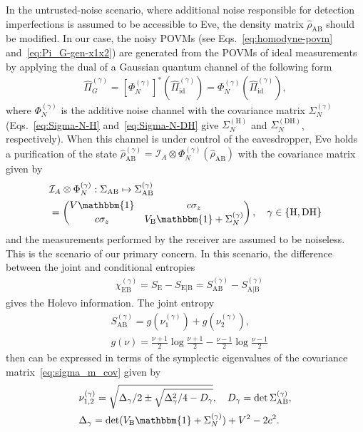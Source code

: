 \documentclass[%
reprint,
superscriptaddress,
 amsmath,amssymb,amsfonts,
 aps,
 pra,
 longbibliography
]{revtex4-2}
\newcommand{\cnj}[1]{{#1}^{\ast}}
\newcommand{\ind}[1]{\mathrm{#1}}
\begin{document}
In the untrusted-noise scenario,
where additional noise
responsible for detection imperfections
is assumed to be accessible to Eve,
the density matrix $\hat{\rho}_{\ind{AB}}$ should be modified.
In our case, the noisy POVMs
(see Eqs.~\eqref{eq:homodyne-povm}
and~\eqref{eq:Pi_G-gen-x1x2})
are generated from the POVMs of ideal measurements
by applying the dual of a Gaussian quantum channel
of the following form
\begin{align}
  \label{eq:Phi_N_Pi}
  \hat{\Pi}_G^{(\gamma)}=
  \cnj{[\Phi_N^{(\gamma)}]}(\hat{\Pi}_{\ind{id}}^{(\gamma)})=
  \Phi_N^{(\gamma)}(\hat{\Pi}_{\ind{id}}^{(\gamma)}),
\end{align}
where $\Phi_N^{(\gamma)}$
is the additive noise channel
with the covariance matrix
$\Sigma_N^{(\gamma)}$
(Eqs.~\eqref{eq:Sigma-N-H} and~\eqref{eq:Sigma-N-DH}
give
$\Sigma_N^{(\ind{H})}$ and $\Sigma_N^{(\ind{DH})}$,
respectively).
When this channel is under control of the eavesdropper, 
Eve holds a purification of the state
$\hat{\rho}_{\ind{AB}}^{(\gamma)}=\mathcal{I}_A\otimes\Phi_N^{(\gamma)}(\hat{\rho}_{\ind{AB}})$
with the covariance matrix given by
\begin{align}
  &
  \label{eq:sigma_m_cov}
\mathcal{I}_A\otimes \Phi_{N}^{(\gamma)}:
  \Sigma_{\ind{AB}}\mapsto
  \Sigma_{\ind{AB}}^{(\gamma)}
  \notag
  \\
  &
  =\begin{pmatrix}
    V\mathbbm{1}&c\sigma_z\\
    c\sigma_z&V_{\ind{B}}\mathbbm{1}+\Sigma_N^{(\gamma)}
\end{pmatrix},\quad \gamma\in\{\ind{H},\ind{DH}\}
\end{align}
and the measurements performed by the receiver
are assumed to be noiseless.
This is the scenario of our primary concern.
In this scenario, 
the difference between the joint and conditional entropies
\begin{align}
  \label{eq:chi}
  &
  \chi_{\ind{EB}} ^{(\gamma)}
    =
    S_{\ind{E}}-S_{\ind{E}|\ind{B}}=S_{\ind{AB}}^{(\gamma)}-S_{\ind{A}|\ind{B}}^{(\gamma)}
\end{align}
gives the Holevo information.
The joint entropy
\begin{align}
  &
  \label{eq:S_AB-gamma}
  S_{\ind{AB}}^{(\gamma)}=g(\nu_1^{(\gamma)})+g(\nu_2^{(\gamma)}),
  \\
  &
\label{eq:g(nu)}
    g(\nu)=\frac{\nu+1}{2}\log \frac{\nu+1}{2}-
    \frac{\nu-1}{2}\log\frac{\nu-1}{2}    
\end{align}
then can be expressed in terms of
the symplectic eigenvalues of the covariance matrix~\eqref{eq:sigma_m_cov}
given by
\begin{align}
  &
    \label{eq:nu-12-gamma}
\nu_{1,2}^{(\gamma)}
    =\sqrt{
\Delta_{\gamma}/2\pm \sqrt{\Delta_{\gamma}^2/4-D_{\gamma}}
    },
    \quad
  D_{\gamma}=\det \Sigma_{\ind{AB}}^{(\gamma)},  
    \\
  &
  \label{eq:D-gamma}
  \Delta_{\gamma}=\det(V_{\ind{B}}\mathbbm{1}+\Sigma_N^{(\gamma)}) +
  V^2- 2 c^2.
\end{align}
\end{document}
